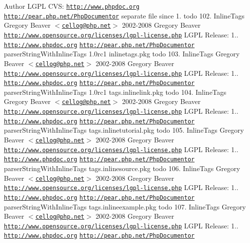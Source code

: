 \begin{DoxyAuthor}{\-Author}
\-L\-G\-P\-L  \-C\-V\-S\-:    \href{http://www.phpdoc.org}{\tt http\-://www.\-phpdoc.\-org}  \href{http://pear.php.net/PhpDocumentor}{\tt http\-://pear.\-php.\-net/\-Php\-Documentor}  separate file since 1.  todo 102.   \-Inline\-Tags  \-Gregory \-Beaver $<$\href{mailto:cellog@php.net}{\tt cellog@php.\-net}$>$  2002-\/2008 \-Gregory \-Beaver  \href{http://www.opensource.org/licenses/lgpl-license.php}{\tt http\-://www.\-opensource.\-org/licenses/lgpl-\/license.\-php} \-L\-G\-P\-L  \-Release\-: 1..   \href{http://www.phpdoc.org}{\tt http\-://www.\-phpdoc.\-org}  \href{http://pear.php.net/PhpDocumentor}{\tt http\-://pear.\-php.\-net/\-Php\-Documentor}  parser\-String\-With\-Inline\-Tags  1.\-0rc1  inlinetags.\-pkg  todo 103.   \-Inline\-Tags  \-Gregory \-Beaver $<$\href{mailto:cellog@php.net}{\tt cellog@php.\-net}$>$  2002-\/2008 \-Gregory \-Beaver  \href{http://www.opensource.org/licenses/lgpl-license.php}{\tt http\-://www.\-opensource.\-org/licenses/lgpl-\/license.\-php} \-L\-G\-P\-L  \-Release\-: 1..   \href{http://www.phpdoc.org}{\tt http\-://www.\-phpdoc.\-org}  \href{http://pear.php.net/PhpDocumentor}{\tt http\-://pear.\-php.\-net/\-Php\-Documentor}  parser\-String\-With\-Inline\-Tags  1.\-0rc1  tags.\-inlinelink.\-pkg  todo 104.   \-Inline\-Tags  \-Gregory \-Beaver $<$\href{mailto:cellog@php.net}{\tt cellog@php.\-net}$>$  2002-\/2008 \-Gregory \-Beaver  \href{http://www.opensource.org/licenses/lgpl-license.php}{\tt http\-://www.\-opensource.\-org/licenses/lgpl-\/license.\-php} \-L\-G\-P\-L  \-Release\-: 1..   \href{http://www.phpdoc.org}{\tt http\-://www.\-phpdoc.\-org}  \href{http://pear.php.net/PhpDocumentor}{\tt http\-://pear.\-php.\-net/\-Php\-Documentor}  parser\-String\-With\-Inline\-Tags  tags.\-inlinetutorial.\-pkg  todo 105.   \-Inline\-Tags  \-Gregory \-Beaver $<$\href{mailto:cellog@php.net}{\tt cellog@php.\-net}$>$  2002-\/2008 \-Gregory \-Beaver  \href{http://www.opensource.org/licenses/lgpl-license.php}{\tt http\-://www.\-opensource.\-org/licenses/lgpl-\/license.\-php} \-L\-G\-P\-L  \-Release\-: 1..   \href{http://www.phpdoc.org}{\tt http\-://www.\-phpdoc.\-org}  \href{http://pear.php.net/PhpDocumentor}{\tt http\-://pear.\-php.\-net/\-Php\-Documentor}  parser\-String\-With\-Inline\-Tags  tags.\-inlinesource.\-pkg  todo 106.   \-Inline\-Tags  \-Gregory \-Beaver $<$\href{mailto:cellog@php.net}{\tt cellog@php.\-net}$>$  2002-\/2008 \-Gregory \-Beaver  \href{http://www.opensource.org/licenses/lgpl-license.php}{\tt http\-://www.\-opensource.\-org/licenses/lgpl-\/license.\-php} \-L\-G\-P\-L  \-Release\-: 1..   \href{http://www.phpdoc.org}{\tt http\-://www.\-phpdoc.\-org}  \href{http://pear.php.net/PhpDocumentor}{\tt http\-://pear.\-php.\-net/\-Php\-Documentor}  parser\-String\-With\-Inline\-Tags  tags.\-inlineexample.\-pkg  todo 107.   \-Inline\-Tags  \-Gregory \-Beaver $<$\href{mailto:cellog@php.net}{\tt cellog@php.\-net}$>$  2002-\/2008 \-Gregory \-Beaver  \href{http://www.opensource.org/licenses/lgpl-license.php}{\tt http\-://www.\-opensource.\-org/licenses/lgpl-\/license.\-php} \-L\-G\-P\-L  \-Release\-: 1..   \href{http://www.phpdoc.org}{\tt http\-://www.\-phpdoc.\-org}  \href{http://pear.php.net/PhpDocumentor}{\tt http\-://pear.\-php.\-net/\-Php\-Documentor}  
\end{DoxyAuthor}
